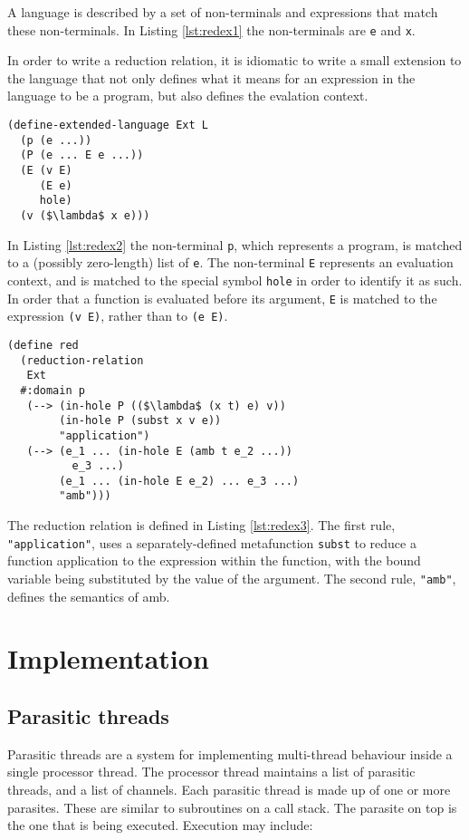 \documentclass[12pt,a4paper,twoside,openright]{report}
\begin{document}
A language is described by a set of non-terminals and expressions that match these non-terminals. In Listing \ref{lst:redex1} the non-terminals are \texttt{e} and \texttt{x}.

In order to write a reduction relation, it is idiomatic to write a small extension to the language that not only defines what it means for an expression in the language to be a program, but also defines the evalation context.

\begin{lstlisting}[caption=An extended language based on L,label={lst:redex2}]
(define-extended-language Ext L
  (p (e ...))
  (P (e ... E e ...))
  (E (v E)
     (E e)
     hole)
  (v ($\lambda$ x e)))
\end{lstlisting}

In Listing \ref{lst:redex2} the non-terminal \texttt{p}, which represents a program, is matched to a (possibly zero-length) list of \texttt{e}. The non-terminal \texttt{E} represents an evaluation context, and is matched to the special symbol \texttt{hole} in order to identify it as such. In order that a function is evaluated before its argument, \texttt{E} is matched to the expression \texttt{(v E)}, rather than to \texttt{(e E)}.

\begin{lstlisting}[caption=Defining a reduction relation in PLT Redex,label={lst:redex3}]
(define red
  (reduction-relation
   Ext
  #:domain p
   (--> (in-hole P (($\lambda$ (x t) e) v))
        (in-hole P (subst x v e))
        "application")
   (--> (e_1 ... (in-hole E (amb t e_2 ...)) 
          e_3 ...)
        (e_1 ... (in-hole E e_2) ... e_3 ...)
        "amb")))
\end{lstlisting}

The reduction relation is defined in Listing \ref{lst:redex3}. The first rule, \texttt{"application"}, uses a separately-defined metafunction \texttt{subst} to reduce a function application to the expression within the function, with the bound variable being substituted by the value of the argument. The second rule, \texttt{"amb"}, defines the semantics of amb.

\chapter{Implementation}

\section{Parasitic threads}
Parasitic threads are a system for implementing multi-thread behaviour inside a single processor thread. The processor thread maintains a list of parasitic threads, and a list of channels. Each parasitic thread is made up of one or more parasites. These are similar to subroutines on a call stack. The parasite on top is the one that is being executed. Execution may include: 
\end{document}
